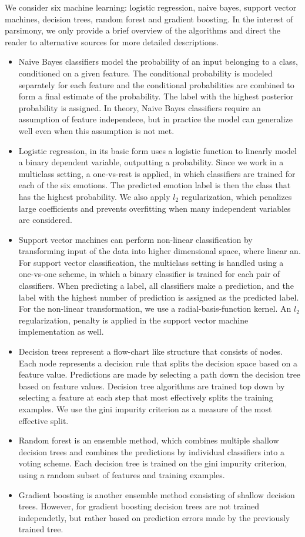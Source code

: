 \documentclass[conference]{IEEEtran}
\begin{document}
We consider six machine learning: logistic regression, naive bayes, support vector machines, decision trees, random forest and gradient boosting. In the interest of parsimony, we only provide a brief overview of the algorithms and direct the reader to alternative sources for more detailed descriptions.
\begin{itemize}
\item Naive Bayes classifiers model the probability of an input belonging to a class, conditioned on a given feature. The conditional probability is modeled separately for each feature and the conditional probabilities are combined to form a final estimate of the probability. The label with the highest posterior probability is assigned. In theory, Naive Bayes classifiers require an assumption of feature independece, but in practice the model can generalize well even when this assumption is not met.
\item Logistic regression, in its basic form uses a logistic function to linearly model a binary dependent variable, outputting a probability. Since we work in a multiclass setting, a one-vs-rest is applied, in which classifiers are trained for each of the six emotions. The predicted emotion label is then the class that has the highest probability. We also apply $l_2$ regularization, which penalizes large coefficients and prevents overfitting when many independent variables are considered.
\item Support vector machines can perform non-linear classification by transforming input of the data into higher dimensional space, where linear  an. For support vector classification, the multiclass setting is handled using a one-vs-one scheme, in which a binary classifier is trained for each pair of classifiers. When predicting a label, all classifiers make a prediction, and the label with the highest number of prediction is assigned as the predicted label. For the non-linear transformation, we use a radial-basis-function kernel. An $l_2$ regularization, penalty is applied in the support vector machine implementation as well.
\item Decision trees represent a flow-chart like structure that consists of nodes. Each node represents a decision rule that splits the decision space based on a feature value. Predictions are made by selecting a path down the decision tree based on feature values. Decision tree algorithms are trained top down by selecting a feature at each step that most effectively splits the training examples. We use the gini impurity criterion as a measure of the most effective split.
\item Random forest is an ensemble method, which combines multiple shallow decision trees and combines the predictions by individual classifiers into a voting scheme. Each decision tree is trained on the gini impurity criterion, using a random subset of features and training examples.
\item Gradient boosting is another ensemble method consisting of shallow decision trees. However, for gradient boosting decision trees are not trained independetly, but rather based on prediction errors made by the previously trained tree.
\end{itemize}
\end{document}
